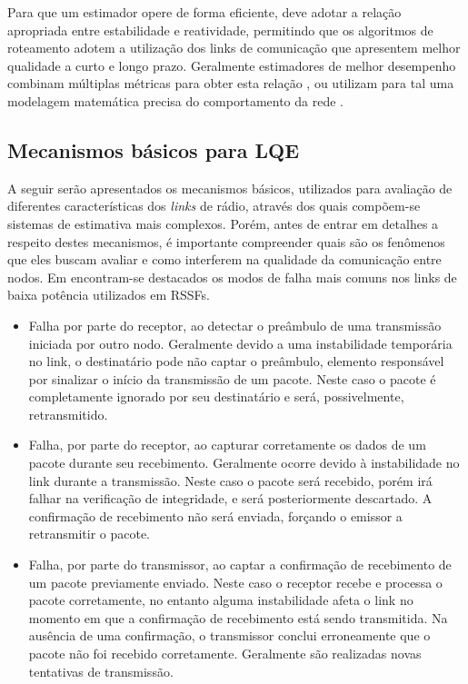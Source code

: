 \documentclass[
	12pt,				%
	openright,			%
	oneside,
	a4paper,			%
	english,			%
	french,				%
	spanish,			%
	brazil				%
	]{abntex2}
\begin{document}
Para que um estimador opere de forma eficiente, deve adotar a relação apropriada entre estabilidade e reatividade, permitindo que os algoritmos de roteamento adotem a utilização dos links de comunicação que apresentem melhor qualidade a curto e longo prazo. Geralmente estimadores de melhor desempenho combinam múltiplas métricas para obter esta relação \cite{Sang2010}, ou utilizam para tal uma modelagem matemática precisa do comportamento da rede \cite{Woo2003}.

\subsection{Mecanismos básicos para LQE}

A seguir serão apresentados os mecanismos básicos, utilizados para avaliação de diferentes características dos \textit{links} de rádio, através dos quais compõem-se sistemas de estimativa mais complexos. Porém, antes de entrar em detalhes a respeito destes mecanismos, é importante compreender quais são os fenômenos que eles buscam avaliar e como interferem na qualidade da comunicação entre nodos. Em \cite{Kusy2011} encontram-se destacados os modos de falha mais comuns nos links de baixa potência utilizados em RSSFs.

\begin{itemize}
	\item Falha por parte do receptor, ao detectar o preâmbulo de uma transmissão iniciada por outro nodo. Geralmente devido a uma instabilidade temporária no link, o destinatário pode não captar o preâmbulo, elemento responsável por sinalizar o início da transmissão de um pacote. Neste caso o pacote é completamente ignorado por seu destinatário e será, possivelmente, retransmitido.
	\item Falha, por parte do receptor, ao capturar corretamente os dados de um pacote durante seu recebimento. Geralmente ocorre devido à instabilidade no link durante a transmissão. Neste caso o pacote será recebido, porém irá falhar na verificação de integridade, e será posteriormente descartado. A confirmação de recebimento não será enviada, forçando o emissor a retransmitir o pacote.
	\item Falha, por parte do transmissor, ao captar a confirmação de recebimento de um pacote previamente enviado. Neste caso o receptor recebe e processa o pacote corretamente, no entanto alguma instabilidade afeta o link no momento em que a confirmação de recebimento está sendo transmitida. Na ausência de uma confirmação, o transmissor conclui erroneamente que o pacote não foi recebido corretamente. Geralmente são realizadas novas tentativas de transmissão.
\end{itemize}
\end{document}

